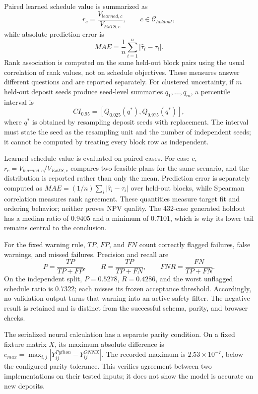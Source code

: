 Paired learned schedule value is summarized as
\begin{equation}
 r_c=\frac{V_{learned,c}}{V_{ExTS,c}},\qquad c\in\mathcal C_{holdout},
\end{equation}
while absolute prediction error is
\begin{equation}
 MAE=\frac{1}{n}\sum_{i=1}^{n}|\hat\tau_i-\tau_i|.
\end{equation}
Rank association is computed on the same held-out block pairs using the usual correlation of rank values, not on schedule objectives. These measures answer different questions and are reported separately. For clustered uncertainty, if $m$ held-out deposit seeds produce seed-level summaries $q_1,\ldots,q_m$, a percentile interval is
\begin{equation}
 CI_{0.95}=\left[Q_{0.025}(q^*),Q_{0.975}(q^*)\right],
\end{equation}
where $q^*$ is obtained by resampling deposit seeds with replacement. The interval must state the seed as the resampling unit and the number of independent seeds; it cannot be computed by treating every block row as independent.

Learned schedule value is evaluated on paired cases. For case $c$, $r_c=V_{learned,c}/V_{ExTS,c}$ compares two feasible plans for the same scenario, and the distribution is reported rather than only the mean. Prediction error is separately computed as $MAE=(1/n)\sum_i|\hat\tau_i-\tau_i|$ over held-out blocks, while Spearman correlation measures rank agreement. These quantities measure target fit and ordering behavior; neither proves NPV quality. The 432-case generated holdout has a median ratio of 0.9405 and a minimum of 0.7101, which is why its lower tail remains central to the conclusion.

For the fixed warning rule, $TP$, $FP$, and $FN$ count correctly flagged failures, false warnings, and missed failures. Precision and recall are
\begin{equation}
 P=\frac{TP}{TP+FP},\qquad R=\frac{TP}{TP+FN},\qquad FNR=\frac{FN}{TP+FN}.
\end{equation}
On the independent split, $P=0.5278$, $R=0.4286$, and the worst unflagged schedule ratio is 0.7322; each misses its frozen acceptance threshold. Accordingly, no validation output turns that warning into an active safety filter. The negative result is retained and is distinct from the successful schema, parity, and browser checks.

The serialized neural calculation has a separate parity condition. On a fixed fixture matrix $X$, its maximum absolute difference is $e_{max}=\max_{i,j}|Y^{Python}_{ij}-Y^{ONNX}_{ij}|$. The recorded maximum is $2.53\times10^{-7}$, below the configured parity tolerance. This verifies agreement between two implementations on their tested inputs; it does not show the model is accurate on new deposits.

